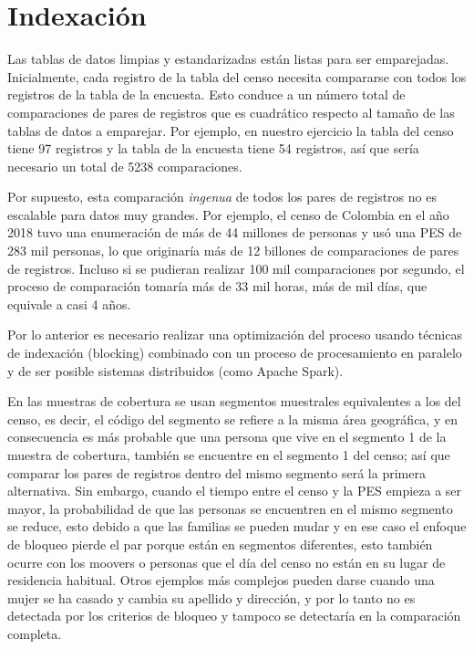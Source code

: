 \documentclass[
  12pt,
]{book}
\begin{document}
\section{Indexación}\label{indexaciuxf3n}

Las tablas de datos limpias y estandarizadas están listas para ser emparejadas. Inicialmente, cada registro de la tabla del censo necesita compararse con todos los registros de la tabla de la encuesta. Esto conduce a un número total de comparaciones de pares de registros que es cuadrático respecto al tamaño de las tablas de datos a emparejar. Por ejemplo, en nuestro ejercicio la tabla del censo tiene 97 registros y la tabla de la encuesta tiene 54 registros, así que sería necesario un total de 5238 comparaciones.

Por supuesto, esta comparación \emph{ingenua} de todos los pares de registros no es escalable para datos muy grandes. Por ejemplo, el censo de Colombia en el año 2018 tuvo una enumeración de más de 44 millones de personas y usó una PES de 283 mil personas, lo que originaría más de 12 billones de comparaciones de pares de registros. Incluso si se pudieran realizar 100 mil comparaciones por segundo, el proceso de comparación tomaría más de 33 mil horas, más de mil días, que equivale a casi 4 años.

Por lo anterior es necesario realizar una optimización del proceso usando técnicas de indexación (blocking) combinado con un proceso de procesamiento en paralelo y de ser posible sistemas distribuidos (como Apache Spark).

En las muestras de cobertura se usan segmentos muestrales equivalentes a los del censo, es decir, el código del segmento se refiere a la misma área geográfica, y en consecuencia es más probable que una persona que vive en el segmento 1 de la muestra de cobertura, también se encuentre en el segmento 1 del censo; así que comparar los pares de registros dentro del mismo segmento será la primera alternativa. Sin embargo, cuando el tiempo entre el censo y la PES empieza a ser mayor, la probabilidad de que las personas se encuentren en el mismo segmento se reduce, esto debido a que las familias se pueden mudar y en ese caso el enfoque de bloqueo pierde el par porque están en segmentos diferentes, esto también ocurre con los moovers o personas que el día del censo no están en su lugar de residencia habitual. Otros ejemplos más complejos pueden darse cuando una mujer se ha casado y cambia su apellido y dirección, y por lo tanto no es detectada por los criterios de bloqueo y tampoco se detectaría en la comparación completa.
\end{document}

